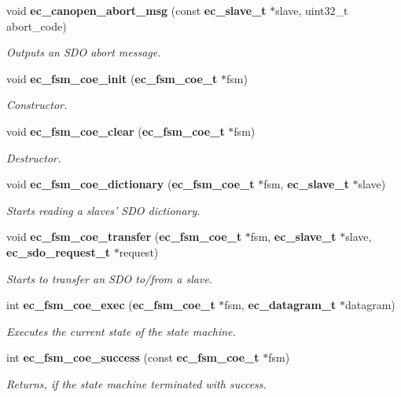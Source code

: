\begin{DoxyCompactItemize}
void {\bf ec\-\_\-canopen\-\_\-abort\-\_\-msg} (const {\bf ec\-\_\-slave\-\_\-t} $\ast$slave, uint32\-\_\-t abort\-\_\-code)
\begin{DoxyCompactList}\small\item\em Outputs an S\-D\-O abort message. \end{DoxyCompactList}\item 
void {\bf ec\-\_\-fsm\-\_\-coe\-\_\-init} ({\bf ec\-\_\-fsm\-\_\-coe\-\_\-t} $\ast$fsm)
\begin{DoxyCompactList}\small\item\em Constructor. \end{DoxyCompactList}\item 
void {\bf ec\-\_\-fsm\-\_\-coe\-\_\-clear} ({\bf ec\-\_\-fsm\-\_\-coe\-\_\-t} $\ast$fsm)
\begin{DoxyCompactList}\small\item\em Destructor. \end{DoxyCompactList}\item 
void {\bf ec\-\_\-fsm\-\_\-coe\-\_\-dictionary} ({\bf ec\-\_\-fsm\-\_\-coe\-\_\-t} $\ast$fsm, {\bf ec\-\_\-slave\-\_\-t} $\ast$slave)
\begin{DoxyCompactList}\small\item\em Starts reading a slaves' S\-D\-O dictionary. \end{DoxyCompactList}\item 
void {\bf ec\-\_\-fsm\-\_\-coe\-\_\-transfer} ({\bf ec\-\_\-fsm\-\_\-coe\-\_\-t} $\ast$fsm, {\bf ec\-\_\-slave\-\_\-t} $\ast$slave, {\bf ec\-\_\-sdo\-\_\-request\-\_\-t} $\ast$request)
\begin{DoxyCompactList}\small\item\em Starts to transfer an S\-D\-O to/from a slave. \end{DoxyCompactList}\item 
int {\bf ec\-\_\-fsm\-\_\-coe\-\_\-exec} ({\bf ec\-\_\-fsm\-\_\-coe\-\_\-t} $\ast$fsm, {\bf ec\-\_\-datagram\-\_\-t} $\ast$datagram)
\begin{DoxyCompactList}\small\item\em Executes the current state of the state machine. \end{DoxyCompactList}\item 
int {\bf ec\-\_\-fsm\-\_\-coe\-\_\-success} (const {\bf ec\-\_\-fsm\-\_\-coe\-\_\-t} $\ast$fsm)
\begin{DoxyCompactList}\small\item\em Returns, if the state machine terminated with success. \end{DoxyCompactList}\item 

\end{DoxyCompactItemize}
